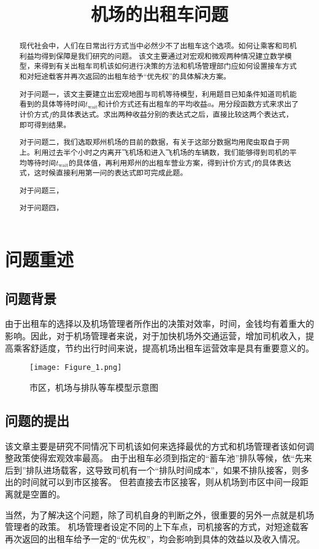 \documentclass{cumcmthesis}
\title{机场的出租车问题}
\begin{document}
\maketitle
\begin{abstract}
	现代社会中，人们在日常出行方式当中必然少不了出租车这个选项。如何让乘客和司机利益均得到保障是我们研究的问题。
	该文主要通过对宏观和微观两种情况建立数学模型，来得到有关出租车司机该如何进行决策的方法和机场管理部门应如何设置接车方式和对短途载客并再次返回的出租车给予“优先权”的具体解决方案。
	\par
	对于问题一，该文主要建立出宏观地图与司机等待模型，利用题目已知条件知道司机能看到的具体等待时间$t_{ \mathrm{wait}}$和计价方式还有出租车的平均收益$a$。用分段函数方式来求出了计价方式$f$的具体表达式。求出两种收益分别的表达式之后，直接比较这两个表达式，即可得到结果。
	\par
	对于问题二，我们选取郑州机场的目前的数据，有关于这部分数据均用爬虫取自于网上。利用过去半个小时之内离开飞机场和进入飞机场的车辆数，我们能够得到司机的平均等待时间$t_{ \mathrm{wait}}$的具体值，再利用郑州的出租车营业方案，得到计价方式$f$的具体表达式，这时候直接利用第一问的表达式即可完成此题。
	\par
	对于问题三，
	\par
	对于问题四，
	\par
\end{abstract}

\tableofcontents
\newpage
\section{问题重述}
\subsection{问题背景}
由于出租车的选择以及机场管理者所作出的决策对效率，时间，金钱均有着重大的影响。因此，对于机场管理者来说，对于加快机场外交通运营，增加司机收入，提高乘客舒适度，节约出行时间来说，提高机场出租车运营效率是具有重要意义的。
\begin{figure}[!h]
	\centering
	\texttt{[image: Figure\_1.png]}
	\caption{市区，机场与排队等车模型示意图}
\end{figure}

\subsection{问题的提出}
该文章主要是研究不同情况下司机该如何来选择最优的方式和机场管理者该如何调整政策使得宏观效率最高。
由于出租车必须到指定的“蓄车池”排队等候，依“先来后到”排队进场载客，这导致司机有一个“排队时间成本”，如果不排队接客，则多出的时间就可以到市区接客。
但若直接去市区接客，则从机场到市区中间一段距离就是空置的。
\par
当然，为了解决这个问题，除了司机自身的判断之外，很重要的另外一点就是机场管理者的政策。
机场管理者设定不同的上下车点，司机接客的方式，对短途载客再次返回的出租车给予一定的“优先权”，均会影响到具体的效益以及收入情况。
\end{document}

